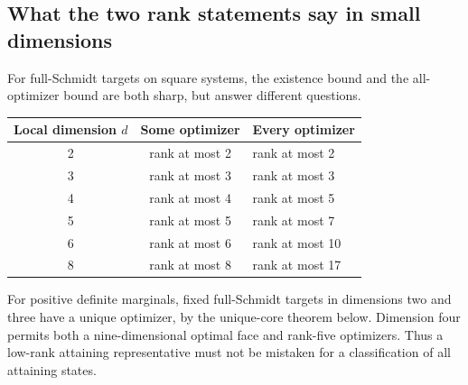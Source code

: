 \subsection{What the two rank statements say in small dimensions}
For full-Schmidt targets on square systems, the existence bound and the
all-optimizer bound are both sharp, but answer different questions.
\begin{center}
\begin{tabular}{ccl}\toprule
Local dimension $d$ & Some optimizer & Every optimizer\\\midrule
2 & rank at most 2 & rank at most 2\\
3 & rank at most 3 & rank at most 3\\
4 & rank at most 4 & rank at most 5\\
5 & rank at most 5 & rank at most 7\\
6 & rank at most 6 & rank at most 10\\
8 & rank at most 8 & rank at most 17\\\bottomrule
\end{tabular}
\end{center}
For positive definite marginals, fixed full-Schmidt targets in dimensions
two and three have a unique optimizer, by the unique-core theorem below.
Dimension four permits both a nine-dimensional optimal face and rank-five
optimizers. Thus a low-rank attaining representative must not be mistaken
for a classification of all attaining states.
